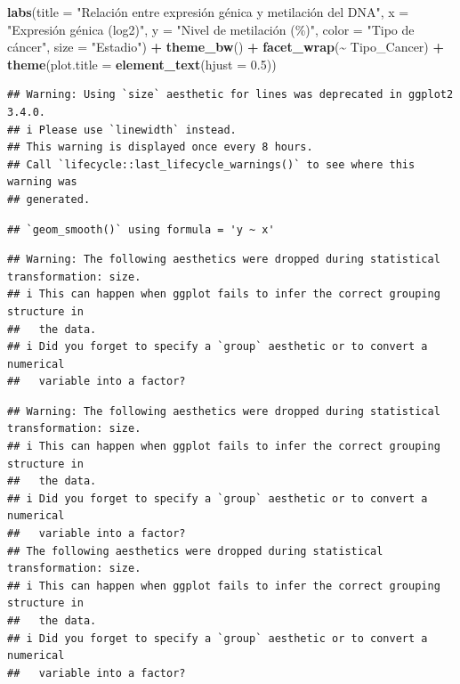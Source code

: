 \documentclass[
]{article}
\newenvironment{Shaded}{\begin{snugshade}}{\end{snugshade}}
\newcommand{\AttributeTok}[1]{\textcolor[rgb]{0.13,0.29,0.53}{#1}}
\newcommand{\FloatTok}[1]{\textcolor[rgb]{0.00,0.00,0.81}{#1}}
\newcommand{\FunctionTok}[1]{\textcolor[rgb]{0.13,0.29,0.53}{\textbf{#1}}}
\newcommand{\NormalTok}[1]{#1}
\newcommand{\SpecialCharTok}[1]{\textcolor[rgb]{0.81,0.36,0.00}{\textbf{#1}}}
\newcommand{\StringTok}[1]{\textcolor[rgb]{0.31,0.60,0.02}{#1}}
\begin{document}
\begin{Shaded}
\begin{Highlighting}[]
  \FunctionTok{labs}\NormalTok{(}\AttributeTok{title =} \StringTok{"Relación entre expresión génica y metilación del DNA"}\NormalTok{,}
       \AttributeTok{x =} \StringTok{"Expresión génica (log2)"}\NormalTok{,}
       \AttributeTok{y =} \StringTok{"Nivel de metilación (\%)"}\NormalTok{,}
       \AttributeTok{color =} \StringTok{"Tipo de cáncer"}\NormalTok{,}
       \AttributeTok{size =} \StringTok{"Estadio"}\NormalTok{) }\SpecialCharTok{+}
  \FunctionTok{theme\_bw}\NormalTok{() }\SpecialCharTok{+}
  \FunctionTok{facet\_wrap}\NormalTok{(}\SpecialCharTok{\textasciitilde{}}\NormalTok{ Tipo\_Cancer) }\SpecialCharTok{+}
  \FunctionTok{theme}\NormalTok{(}\AttributeTok{plot.title =} \FunctionTok{element\_text}\NormalTok{(}\AttributeTok{hjust =} \FloatTok{0.5}\NormalTok{))}
\end{Highlighting}
\end{Shaded}

\begin{verbatim}
## Warning: Using `size` aesthetic for lines was deprecated in ggplot2 3.4.0.
## i Please use `linewidth` instead.
## This warning is displayed once every 8 hours.
## Call `lifecycle::last_lifecycle_warnings()` to see where this warning was
## generated.
\end{verbatim}

\begin{verbatim}
## `geom_smooth()` using formula = 'y ~ x'
\end{verbatim}

\begin{verbatim}
## Warning: The following aesthetics were dropped during statistical transformation: size.
## i This can happen when ggplot fails to infer the correct grouping structure in
##   the data.
## i Did you forget to specify a `group` aesthetic or to convert a numerical
##   variable into a factor?
\end{verbatim}

\begin{verbatim}
## Warning: The following aesthetics were dropped during statistical transformation: size.
## i This can happen when ggplot fails to infer the correct grouping structure in
##   the data.
## i Did you forget to specify a `group` aesthetic or to convert a numerical
##   variable into a factor?
## The following aesthetics were dropped during statistical transformation: size.
## i This can happen when ggplot fails to infer the correct grouping structure in
##   the data.
## i Did you forget to specify a `group` aesthetic or to convert a numerical
##   variable into a factor?
\end{verbatim}
\end{document}
